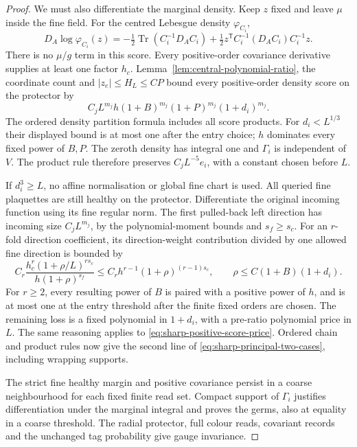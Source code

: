 \documentclass[11pt,reqno]{amsart}
\numberwithin{equation}{section}
\theoremstyle{definition}
\theoremstyle{remark}
\begin{document}
\begin{proof}
We must also differentiate the marginal density. Keep
\(z\) fixed and leave \(\mu\) inside the fine field.
For the centred Lebesgue density \(\varphi_{C_i}\),
\begin{equation}
 D_A\log\varphi_{C_i}(z)
  =-\tfrac12\operatorname{Tr}(C_i^{-1}D_AC_i)
   +\tfrac12 z^{\mathsf T}C_i^{-1}(D_AC_i)C_i^{-1}z.
 \label{eq:sharp-centred-score}
\end{equation}
There is no \(\mu/g\) term in this score. Every
positive-order covariance derivative supplies at least
one factor \(h_c\). Lemma~\ref{lem:central-polynomial-ratio},
the coordinate count and \(|z_e|\le H_L\le CP\) bound
every positive-order density score on the protector by
\begin{equation}
 C_jL^{m_j}h(1+B)^{m_j}(1+P)^{m_j}(1+d_i)^{m_j}.
 \label{eq:sharp-positive-score-price}
\end{equation}
The ordered density partition formula includes all score
products. For \(d_i<L^{1/3}\) their displayed bound is
at most one after the entry choice; \(h\) dominates every
fixed power of \(B,P\). The zeroth density has integral
one and \(\Gamma_i\) is independent of \(V\). The product
rule therefore preserves \(C_jL^{-5}e_i\), with a constant
chosen before \(L\).

If \(d_i^3\ge L\), no affine normalisation or global fine
chart is used. All queried fine plaquettes are still
healthy on the protector. Differentiate the original
incoming function using its fine regular norm. The first
pulled-back left direction has incoming size
\(C_jL^{m_j}\), by the polynomial-moment bounds and
\(s_f\ge s_c\). For an \(r\)-fold direction coefficient,
its direction-weight contribution divided by one allowed
fine direction is bounded by
\[
 C_r\frac{h_c^r(1+\rho/L)^{rs_c}}
                 {h(1+\rho)^{s_f}}
       \le C_rh^{r-1}(1+\rho)^{(r-1)s_c},
       \qquad \rho\le C(1+B)(1+d_i).
\]
For \(r\ge2\), every resulting power of \(B\) is paired
with a positive power of \(h\), and is at most one at
the entry threshold after the finite fixed orders are
chosen. The remaining loss is a fixed polynomial in
\(1+d_i\), with a pre-ratio polynomial price in \(L\).
The same reasoning applies to
\eqref{eq:sharp-positive-score-price}. Ordered chain
and product rules now give the second line of
\eqref{eq:sharp-principal-two-cases}, including wrapping
supports.

The strict fine healthy margin and positive covariance
persist in a coarse neighbourhood for each fixed finite
read set. Compact support of \(\Gamma_i\) justifies
differentiation under the marginal integral and proves
the germs, also at equality in a coarse threshold. The
radial protector, full colour reads, covariant records
and the unchanged tag probability give gauge invariance.
\end{proof}
\end{document}
